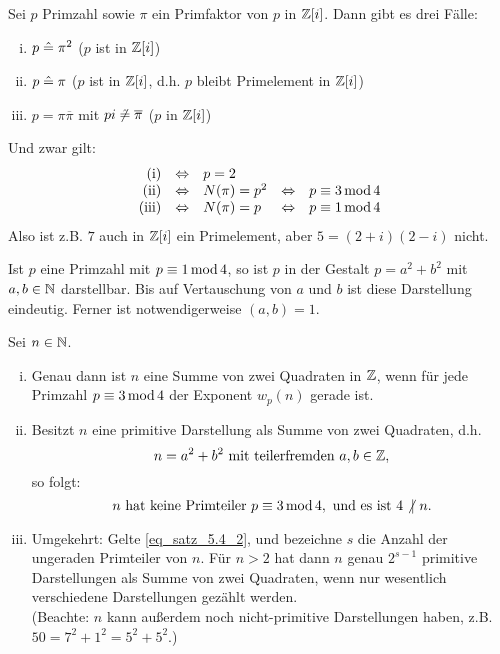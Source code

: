 \begin{satz} \label{satz_5.3}
	Sei $p$ Primzahl sowie $\pi$ ein Primfaktor von $p$ in $\mathbb{Z}[i]$. Dann gibt es drei Fälle: \begin{enumerate}[(i)]
		\item $p \mathrel{\hat=} \pi^2$ \quad ($p$ ist  in $\mathbb{Z}[i]$)
		\item $p \mathrel{\hat=} \pi$ \quad ($p$ ist  in $\mathbb{Z}[i]$, d.h. $p$ bleibt Primelement in $\mathbb{Z}[i]$)
		\item $p = \pi \overline{\pi}$ mit $pi \not \mathrel{\hat=} \overline{\pi}$ \quad ($p$  in $\mathbb{Z}[i]$)
	\end{enumerate}
	Und zwar gilt:  
	\[\begin{array}{rclcl}
		\text{(i)} & \Leftrightarrow &  p = 2 &  & \\ 
		\text{(ii)} & \Leftrightarrow  & N(\pi) = p^2 & \Leftrightarrow &  p \equiv 3 \operatorname{mod} 4 \\ 
		\text{(iii)} & \Leftrightarrow & N(\pi) = p & \Leftrightarrow &  p \equiv 1 \operatorname{mod} 4 \\ 
	\end{array}\]
	Also ist z.B. $7$ auch in $\mathbb{Z}[i]$ ein Primelement, aber $5 = (2+i)(2-i)$ nicht.	
\end{satz}

	Ist $p$ eine Primzahl mit $p \equiv 1 \operatorname{mod} 4$, so ist $p$ in der Gestalt $p = a^2 + b^2$ mit $a,b \in \mathbb{N}$ darstellbar. Bis auf Vertauschung von $a$ und $b$ ist diese Darstellung eindeutig. Ferner ist notwendigerweise $(a,b) = 1$.
	
\begin{satz} \label{satz_5.4}
	Sei $n \in \mathbb{N}$. \begin{enumerate}[(i)]
		\item Genau dann ist $n$ eine Summe von zwei Quadraten in $\mathbb{Z}$, wenn für jede Primzahl $p \equiv 3 \operatorname{mod} 4$ der Exponent $w_p(n)$ gerade ist.
		\item Besitzt $n$ eine primitive Darstellung als Summe von zwei Quadraten, d.h.
		\begin{equation}
			n = a^2 + b^2 \text{ mit teilerfremden } a,b \in \mathbb{Z}, \label{eq_satz_5.4_1}
		\end{equation}
		so folgt:
		\begin{equation}
			n \text{ hat keine Primteiler } p \equiv 3 \operatorname{mod} 4, \text{ und es ist } 4 \not | \ n. \label{eq_satz_5.4_2}
		\end{equation}
		\item Umgekehrt: Gelte \eqref{eq_satz_5.4_2}, und bezeichne $s$ die Anzahl der ungeraden Primteiler von $n$. Für $n > 2$ hat dann $n$ genau $2^{s-1}$ primitive Darstellungen als Summe von zwei Quadraten, wenn nur wesentlich verschiedene Darstellungen gezählt werden. \\
		(Beachte: $n$ kann außerdem noch nicht-primitive Darstellungen haben, z.B. $50 = 7^2 + 1^2 = 5^2 + 5^2$.)
	\end{enumerate}
\end{satz}

